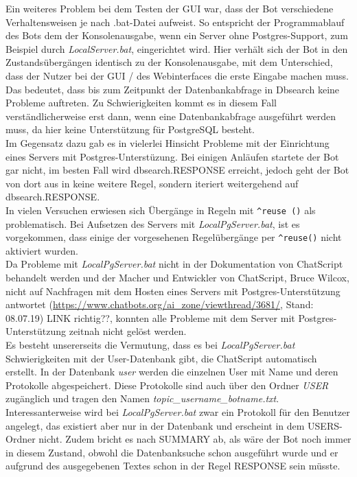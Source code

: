 Ein weiteres Problem bei dem Testen der GUI war, dass der Bot verschiedene Verhaltensweisen je nach .bat-Datei aufweist. So entspricht der Programmablauf des Bots dem der Konsolenausgabe, wenn ein Server ohne Postgres-Support, zum Beispiel durch \textit{LocalServer.bat}, eingerichtet wird. Hier verhält sich der Bot in den Zustandsübergängen identisch zu der Konsolenausgabe, mit dem Unterschied, dass der Nutzer  bei der GUI / des Webinterfaces die erste Eingabe machen muss.\\
Das bedeutet, dass bis zum Zeitpunkt der Datenbankabfrage in Dbsearch keine Probleme auftreten. Zu Schwierigkeiten kommt es in diesem Fall verständlicherweise erst dann, wenn eine Datenbankabfrage ausgeführt werden muss, da hier keine Unterstützung für PostgreSQL besteht.\\
Im Gegensatz dazu gab es in vielerlei Hinsicht Probleme mit der Einrichtung eines Servers mit Postgres-Unterstüzung. Bei einigen Anläufen startete der Bot gar nicht, im besten Fall wird \texttildelow dbsearch.RESPONSE erreicht, jedoch geht der Bot von dort aus in keine weitere Regel, sondern iteriert weitergehend auf \texttildelow dbsearch.RESPONSE.\\
In vielen Versuchen erwiesen sich Übergänge in Regeln mit \lstinline|^reuse ()| als problematisch. Bei Aufsetzen des Servers mit \textit{LocalPgServer.bat}, ist es vorgekommen, dass einige der vorgesehenen Regelübergänge per \lstinline|^reuse()| nicht aktiviert wurden. \\
Da Probleme mit \textit{LocalPgServer.bat} nicht in der Dokumentation von ChatScript behandelt werden und der Macher und Entwickler von ChatScript, Bruce Wilcox, nicht auf Nachfragen mit dem Hosten eines Servers mit Postgres-Unterstützung antwortet (\url{https://www.chatbots.org/ai_zone/viewthread/3681/}, Stand: 08.07.19) \textcolor[rgb]{1,0.68,0.36}{LINK richtig??}, konnten alle Probleme mit dem Server mit Postgres-Unterstützung zeitnah nicht gelöst werden.\\
Es besteht unsererseits die Vermutung, dass es bei \textit{LocalPgServer.bat} Schwierigkeiten mit der User-Datenbank gibt, die ChatScript automatisch erstellt. In der Datenbank \textit{user} werden die einzelnen User mit Name und deren Protokolle abgespeichert. Diese Protokolle sind auch über den Ordner \textit{USER} zugänglich und tragen den Namen \textit{topic\_username\_botname.txt}. Interessanterweise wird bei \textit{LocalPgServer.bat} zwar ein Protokoll für den Benutzer angelegt, das existiert aber nur in der Datenbank und erscheint in dem USERS-Ordner nicht. Zudem bricht es nach SUMMARY ab, als wäre der Bot noch immer in diesem Zustand, obwohl die Datenbanksuche schon ausgeführt wurde und er aufgrund des ausgegebenen Textes schon in der Regel RESPONSE sein müsste.\\
